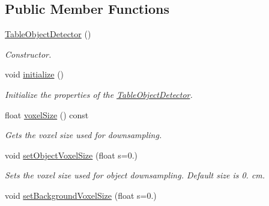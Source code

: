 \subsection*{Public Member Functions}
\begin{DoxyCompactItemize}
\item 
\hypertarget{classope_1_1_table_object_detector_a5f57d754cc2940daa50c9f056571ff9c}{\hyperlink{classope_1_1_table_object_detector_a5f57d754cc2940daa50c9f056571ff9c}{Table\-Object\-Detector} ()}\label{classope_1_1_table_object_detector_a5f57d754cc2940daa50c9f056571ff9c}

\begin{DoxyCompactList}\small\item\em Constructor. \end{DoxyCompactList}\item 
\hypertarget{classope_1_1_table_object_detector_aee3f6351adf71c9cd2d6f2f75af5c361}{void \hyperlink{classope_1_1_table_object_detector_aee3f6351adf71c9cd2d6f2f75af5c361}{initialize} ()}\label{classope_1_1_table_object_detector_aee3f6351adf71c9cd2d6f2f75af5c361}

\begin{DoxyCompactList}\small\item\em Initialize the properties of the \hyperlink{classope_1_1_table_object_detector}{Table\-Object\-Detector}. \end{DoxyCompactList}\item 
\hypertarget{classope_1_1_table_object_detector_add7061315f99ba346ec676f48a0bab25}{float \hyperlink{classope_1_1_table_object_detector_add7061315f99ba346ec676f48a0bab25}{voxel\-Size} () const }\label{classope_1_1_table_object_detector_add7061315f99ba346ec676f48a0bab25}

\begin{DoxyCompactList}\small\item\em Gets the voxel size used for downsampling. \end{DoxyCompactList}\item 
\hypertarget{classope_1_1_table_object_detector_af42549269acc976a93ef8d82ff2a030c}{void \hyperlink{classope_1_1_table_object_detector_af42549269acc976a93ef8d82ff2a030c}{set\-Object\-Voxel\-Size} (float s=0.)}\label{classope_1_1_table_object_detector_af42549269acc976a93ef8d82ff2a030c}

\begin{DoxyCompactList}\small\item\em Sets the voxel size used for object downsampling. Default size is 0. cm. \end{DoxyCompactList}\item 
\hypertarget{classope_1_1_table_object_detector_aadb6e95bdc3ed55de1db234d28565991}{void \hyperlink{classope_1_1_table_object_detector_aadb6e95bdc3ed55de1db234d28565991}{set\-Background\-Voxel\-Size} (float s=0.)}\label{classope_1_1_table_object_detector_aadb6e95bdc3ed55de1db234d28565991}


\end{DoxyCompactItemize}
